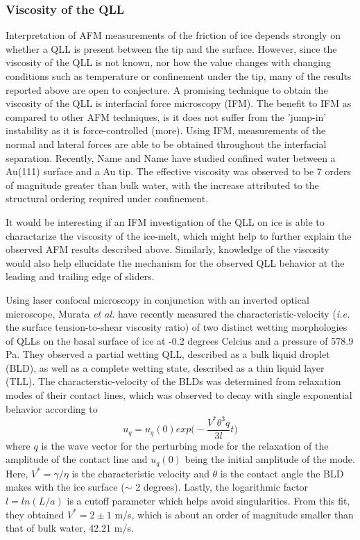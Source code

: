 \subsubsection{Viscosity of the QLL}
 Interpretation of AFM measurements of the friction of ice depends
 strongly on whether a QLL is present between the tip and the
 surface. However, since the viscosity of the QLL is not known, nor
 how the value changes with changing conditions such as temperature or
 confinement under the tip, many of the results reported above are
 open to conjecture. A promising technique to obtain the viscosity of
 the QLL is interfacial force microscopy (IFM). The benefit to IFM as
 compared to other AFM techniques, is it does not suffer from the
 'jump-in' instability as it is  force-controlled (more). Using IFM,
 measurements of the normal and lateral forces are able to be obtained
 throughout the interfacial separation.\cite{Joyce1991} Recently, Name and
 Name have studied confined water between a Au(111) surface and a Au
 tip.\cite{Major2006} The effective viscosity was observed to be 7 orders of
 magnitude greater than bulk water, with the increase attributed to
 the structural ordering required under confinement. 

 It would be interesting if an IFM investigation of the QLL on ice is
 able to charactarize the viscosity of the ice-melt, which might help
 to further explain the observed AFM results described
 above. Similarly, knowledge of the viscosity would also help
 ellucidate the mechanism for the observed QLL behavior at the leading
 and trailing edge of sliders.



Using laser confocal microscopy in conjunction with an inverted
optical microscope, Murata \textit{et al.} have recently measured the
characteristic-velocity (\textit{i.e.} the surface tension-to-shear
viscosity ratio) of two distinct wetting morphologies of QLLs on the
basal surface of ice at -0.2 degrees Celcius and a pressure of 578.9
Pa.\cite{Murata2015} They observed a partial wetting QLL, described as
a bulk liquid droplet (BLD), as well as a complete wetting state,
described as a thin liquid layer (TLL). The characterstic-velocity of
the BLDs was determined from relaxation modes of their contact lines,
which was observed to decay with single exponential behavior according
to
\begin{equation}
u_q = u_q(0) exp\Bigg(-\frac{V^* \theta^3 q}{3l}t\Bigg)
\end{equation}
where $q$ is the wave vector for the perturbing mode for the
relaxation of the amplitude of the contact line and $u_q(0)$ being the
initial amplitude of the mode. Here, $V^* = \gamma / \eta$ is the
characteristic velocity and $\theta$ is the contact angle the BLD makes
with the ice surface ($\sim$ 2 degrees). Lastly, the logarithmic factor
$l=ln(L/a)$ is a cutoff parameter which helps avoid
singularities. From this fit, they obtained $V^* = 2 \pm 1$ m/s, which
is about an order of magnitude smaller than that of bulk water, 42.21
m/s.

